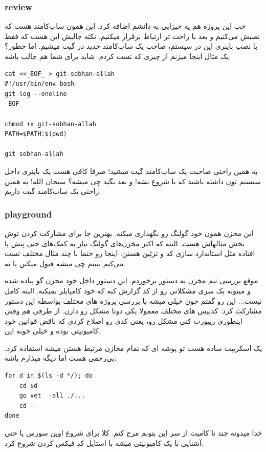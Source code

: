 \subsubsection{review}
خب این پروژه هم یه چیزایی به دانشم اضافه کرد. این همون ساب‌کامند  هست که نصبش می‌کنیم و بعد با 
راحت تر ارتباط برقرار میکنیم. نکته جالبش این هست که فقط با نصب باینری این در سیستم، صاحب یک ساب‌کامند جدید در گیت میشیم. اما چطور؟
یک مثال اینجا میزنم از چیزی که تست کردم. شاید برای شما هم جالب باشه:

\begin{latin}
\begin{verbatim}
cat <<_EOF_ > git-sobhan-allah
#!/usr/bin/env bash
git log --oneline
_EOF_

chmod +x git-sobhan-allah
PATH=$PATH:$(pwd)

git sobhan-allah
\end{verbatim}
\end{latin}

به همین راحتی صاحبت یک ساب‌کامند گیت میشید! صرفا کافی هست یک باینری داخل  سیستم تون داشته باشید که با  شروع بشه!
و بعد بگید چی میشه؟ سبحان الله! به همین راحتی یک ساب‌کامند گیت داریم.

\subsubsection{playground}
این مخزن همون  خود گولنگ رو نگهداری میکنه. بهترین جا برای مشارکت کردن توش بخش مثالهاش هست.
البته که اکثر مخزن‌های گولنگ نیاز به کمک‌های حتی پیش پا افتاده مثل استاندارد سازی کد و تزئین هستن.
اینجا رو حتما با چند مثال مختلف تست می‌کنم ببینم چی میشه قبول میکنن یا نه.

موقع بررسی تیم مخزن به دستور  برخوردم. این دستور داخل خود مخزن گو پیاده شده و میتونه یک سری مشکلاتی رو از کد گزارش کنه که
خود کامپایلر نمیکنه. البته کامل نیست... این رو گفتم چون خیلی میشه با بررسی پروژه های مختلف بواسطه این دستور مشارکت کرد.
کدبیس های مختلف معمولا یکی دوتا مشکل رو دارن. از طرفی هم وقتی اینطوری ریپورت کنی مشکل رو، یعنی کدی رو اصلاح کردی که ناقض
قوانین خود کامیونیتی بوده و خیلی خوبه این.

یک اسکریپت ساده هست تو پوشه ای که تمام مخازن مرتبط هستن میشه استفاده کرد. بی‌رحمی هست اما دیگه میذارم باشه:
\begin{latin}
\begin{verbatim}
for d in $(ls -d */); do
    cd $d
    go vet  -all ./...
    cd -
done
\end{verbatim}
\end{latin}
خدا میدونه چند تا کامیت از سر این بتونم مرج کنم. کلا برای شروع اوپن سورس یا حتی آشنایی با یک کامیونیتی میشه با استایل کد فیکس کردن
شروع کرد.

